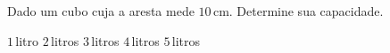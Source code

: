 Dado um cubo cuja a aresta mede $10$\,cm. Determine sua capacidade.

$1$\,litro
$2$\,litros
$3$\,litros
$4$\,litros
$5$\,litros


